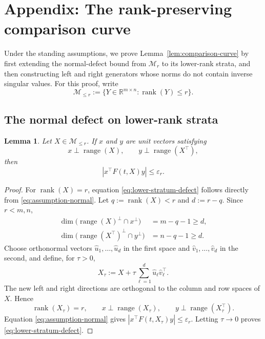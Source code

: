 \documentclass[]{article}
\numberwithin{equation}{section}
\theoremstyle{plain}
\newtheorem{lemma}[theorem]{Lemma}
\theoremstyle{remark}
\numberwithin{algorithm}{section}
\newcommand{\R}{\mathbb{R}}
\newcommand{\Mr}{\mathcal{M}_r}
\newcommand{\Mle}{\mathcal{M}_{\le r}}
\newcommand{\eps}{\varepsilon}
\newcommand{\rank}{\operatorname{rank}}
\newcommand{\range}{\operatorname{range}}
\begin{document}
\appendix
\section{Appendix: The rank-preserving comparison curve}
\label{app:comparison-curve}

Under the standing assumptions, we prove
Lemma~\ref{lem:comparison-curve} by first extending the
normal-defect bound from \(\Mr\) to its lower-rank strata, and then constructing
left and right generators whose norms do not contain inverse singular
values.
For this proof, write
\begin{equation}\label{eq:lower-rank-set}
 \Mle:=\{Y\in\R^{m\times n}:\rank(Y)\le r\}.
\end{equation}

\subsection{The normal defect on lower-rank strata}
\label{app:lower-strata}

\begin{lemma}
\label{lem:lower-stratum-defect}
Let \(X\in\Mle\).  If \(x\) and \(y\) are unit vectors satisfying
\begin{equation}\label{eq:lower-normal-directions}
 x\perp\range(X),
 \qquad
 y\perp\range(X^\top),
\end{equation}
then
\begin{equation}\label{eq:lower-stratum-defect}
 |x^\top F(t,X)y|\le\eps_r.
\end{equation}
\end{lemma}

\begin{proof}
For \(\rank(X)=r\), equation \eqref{eq:lower-stratum-defect} follows directly
from \eqref{eq:assumption-normal}.  Let \(q:=\rank(X)<r\) and
\(d:=r-q\).  Since \(r<m,n\),
\begin{align}
 \dim\bigl(\range(X)^\perp\cap x^\perp\bigr)
 &=m-q-1\ge d,                                      \label{eq:left-completion-dimension}\\
 \dim\bigl(\range(X^\top)^\perp\cap y^\perp\bigr)
 &=n-q-1\ge d.                                      \label{eq:right-completion-dimension}
\end{align}
Choose orthonormal vectors \(\widehat u_1,\ldots,\widehat u_d\) in the
first space and \(\widehat v_1,\ldots,\widehat v_d\) in the second, and
define, for \(\tau>0\),
\begin{equation}\label{eq:rank-completion}
 X_\tau:=X+\tau\sum_{\ell=1}^d\widehat u_\ell\widehat v_\ell^\top.
\end{equation}
The new left and right directions are orthogonal to the column and row
spaces of \(X\).  Hence
\begin{equation}\label{eq:rank-completion-properties}
 \rank(X_\tau)=r,
 \qquad
 x\perp\range(X_\tau),
 \qquad
 y\perp\range(X_\tau^\top).
\end{equation}
Equation \eqref{eq:assumption-normal} gives
\(|x^\top F(t,X_\tau)y|\le\eps_r\).  Letting \(\tau\to0\) proves
\eqref{eq:lower-stratum-defect}.
\end{proof}
\end{document}
